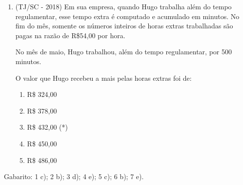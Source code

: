 \begin{enumerate}[1)]
 \item (TJ/SC - 2018) Em sua empresa, quando Hugo trabalha além do tempo regulamentar, esse tempo extra é computado e acumulado em minutos. No fim do mês, somente os números inteiros de horas extras trabalhadas são pagas na razão de R\$54,00 por hora.
  
  No mês de maio, Hugo trabalhou, além do tempo regulamentar, por 500 minutos.
  
  O valor que Hugo recebeu a mais pelas horas extras foi de:
  \begin{enumerate}
  \item R\$ 324,00
  \item R\$ 378,00
  \item R\$ 432,00 (*)
  \item R\$ 450,00
  \item R\$ 486,00
 \end{enumerate}
 
\end{enumerate}

Gabarito: 1 c); 2 b); 3 d); 4 e); 5 c); 6 b); 7 e).

